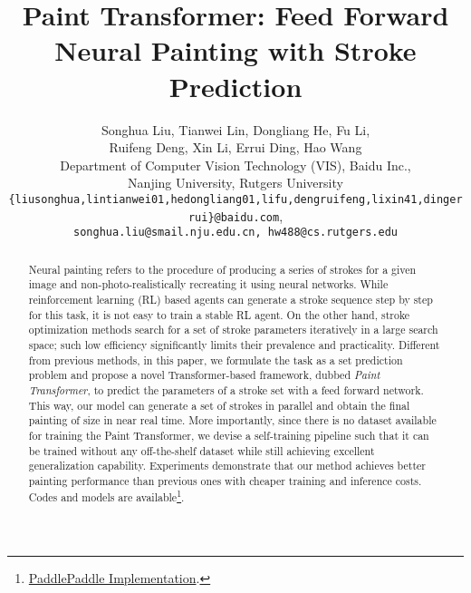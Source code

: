 \documentclass[10pt,twocolumn,letterpaper]{article}
\begin{document}
\title{Paint Transformer: Feed Forward Neural Painting with Stroke Prediction}

\author{Songhua Liu, Tianwei Lin, Dongliang He, Fu Li,\\Ruifeng Deng, Xin Li, Errui Ding, Hao Wang\\
Department of Computer Vision Technology (VIS), Baidu Inc.,\\
Nanjing University, Rutgers University\\
{\tt\small \{liusonghua,lintianwei01,hedongliang01,lifu,dengruifeng,lixin41,dingerrui\}@baidu.com},\\
{\tt\small songhua.liu@smail.nju.edu.cn, hw488@cs.rutgers.edu}\\
}

\twocolumn[{\maketitle
\begin{figure}[H]
\hsize=\textwidth \centering
\vspace{-1cm}
\texttt{[image: Figure/first\_page.png]}
\caption{Illustration of our results. The second row demonstrates the progressive painting process. Zoom-in for better view.}
\label{fig:overview}
\end{figure}
}]

\renewcommand{\thefootnote}{\fnsymbol{footnote}}
\renewcommand{\thefootnote}{\arabic{footnote}}

\ificcvfinal\thispagestyle{empty}\fi

\begin{abstract}
   Neural painting refers to the procedure of producing a series of strokes for a given image and non-photo-realistically recreating it using neural networks. 
   While reinforcement learning (RL) based agents can generate a stroke sequence step by step for this task, it is not easy to train a stable RL agent. 
   On the other hand, stroke optimization methods search for a set of stroke parameters iteratively in a large search space; such low efficiency significantly limits their prevalence and practicality. 
   Different from previous methods, in this paper, we formulate the task as a set prediction problem and propose a novel Transformer-based framework, dubbed \textit{Paint Transformer}, to predict the parameters of a stroke set with a feed forward network.
   This way, our model can generate a set of strokes in parallel and obtain the final painting of size  in near real time. 
   More importantly, since there is no dataset available for training the Paint Transformer, we devise a self-training pipeline such that it can be trained without any off-the-shelf dataset while still achieving excellent generalization capability.
   Experiments demonstrate that our method achieves better painting performance than previous ones with cheaper training and inference costs. Codes and models are available\footnote{\href{https://github.com/wzmsltw/PaintTransformer}{PaddlePaddle Implementation}.}.
\end{abstract}
\end{document}
